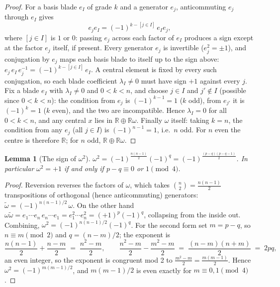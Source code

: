 \documentclass[11pt]{article}
\theoremstyle{plain}
\newtheorem{lemma}[theorem]{Lemma}
\theoremstyle{definition}
\newcommand{\R}{\mathbb{R}}
\begin{document}
\begin{proof}
For a basis blade $e_I$ of grade $k$ and a generator $e_j$, anticommuting $e_j$ through $e_I$ gives
\[
e_j e_I = (-1)^{k - [j \in I]}\, e_I e_j,
\]
where $[j \in I]$ is $1$ or $0$: passing $e_j$ across each factor of $e_I$ produces a sign except at the factor $e_j$ itself, if present. Every generator $e_j$ is invertible ($e_j^2 = \pm 1$), and conjugation by $e_j$ maps each basis blade to itself up to the sign above: $e_j\, e_I\, e_j^{-1} = (-1)^{k - [j \in I]}\, e_I$. A central element is fixed by every such conjugation, so each blade coefficient $\lambda_I \neq 0$ must have sign $+1$ against every $j$. Fix a blade $e_I$ with $\lambda_I \neq 0$ and $0 < k < n$, and choose $j \in I$ and $j' \notin I$ (possible since $0 < k < n$): the condition from $e_j$ is $(-1)^{k-1} = 1$ ($k$ odd), from $e_{j'}$ it is $(-1)^{k} = 1$ ($k$ even), and the two are incompatible. Hence $\lambda_I = 0$ for all $0 < k < n$, and any central $x$ lies in $\R \oplus \R\omega$. Finally $\omega$ itself: taking $k = n$, the condition from any $e_j$ (all $j \in I$) is $(-1)^{n-1} = 1$, i.e.\ $n$ odd. For $n$ even the centre is therefore $\R$; for $n$ odd, $\R \oplus \R\omega$.
\end{proof}

\begin{lemma}[The sign of $\omega^2$]\label{tk:omegasq}
$\displaystyle \omega^2 = (-1)^{\tfrac{n(n-1)}{2}} (-1)^q = (-1)^{\tfrac{(p-q)(p-q-1)}{2}}$. In particular $\omega^2 = +1$ if and only if $p - q \equiv 0$ or $1 \pmod 4$.
\end{lemma}

\begin{proof}
Reversion reverses the factors of $\omega$, which takes $\binom{n}{2} = \tfrac{n(n-1)}{2}$ transpositions of orthogonal (hence anticommuting) generators: $\tilde{\omega} = (-1)^{n(n-1)/2}\,\omega$. On the other hand $\omega \tilde{\omega} = e_1 \cdots e_n\, e_n \cdots e_1 = e_1^2 \cdots e_n^2 = (+1)^p(-1)^q$, collapsing from the inside out. Combining, $\omega^2 = (-1)^{n(n-1)/2}(-1)^q$. For the second form set $m = p - q$, so $n \equiv m \pmod 2$ and $q = (n-m)/2$; the exponent is
\[
\frac{n(n-1)}{2} + \frac{n-m}{2} \;=\; \frac{n^2 - m}{2},
\qquad
\frac{n^2 - m}{2} - \frac{m^2 - m}{2} \;=\; \frac{(n-m)(n+m)}{2} \;=\; 2pq,
\]
an even integer, so the exponent is congruent mod 2 to $\tfrac{m^2 - m}{2} = \tfrac{m(m-1)}{2}$. Hence $\omega^2 = (-1)^{m(m-1)/2}$, and $m(m-1)/2$ is even exactly for $m \equiv 0, 1 \pmod 4$.
\end{proof}
\end{document}
